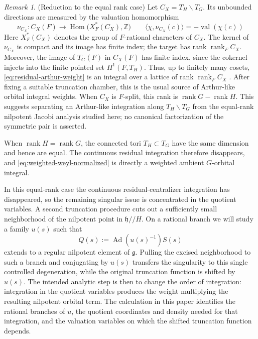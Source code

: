 \documentclass[11pt]{amsart}
\theoremstyle{definition}
\theoremstyle{remark}
\newtheorem{remark}[remark]{Remark}
\newcommand{\Ad}{\operatorname{Ad}}
\newcommand{\rank}{\operatorname{rank}}
\newcommand{\Hom}{\operatorname{Hom}}
\newcommand{\val}{\operatorname{val}}
\newcommand{\g}{\mathfrak g}
\newcommand{\h}{\mathfrak h}
\begin{document}
\begin{remark}\label{rem:equal-rank-reduction} (Reduction to the equal rank case)
Let $C_X=T_H\backslash T_G$.  Its unbounded directions are measured by
the valuation homomorphism
\[
 \nu_{C_X}:C_X(F)\longrightarrow
 \Hom\bigl(X_F^*(C_X),\mathbb Z\bigr)
 \qquad
 \langle\chi,\nu_{C_X}(c)\rangle=-\val(\chi(c))
\]
Here $X_F^*(C_X)$ denotes the group of $F$-rational characters of $C_X$.
The kernel of $\nu_{C_X}$ is compact and its image has finite index; the
target has rank $\rank_F C_X$.  Moreover, the image of $T_G(F)$ in $C_X(F)$ has finite index,
since the cokernel injects into the finite pointed set $H^1(F,T_H)$.  Thus,
up to finitely many cosets, \eqref{eq:residual-arthur-weight} is an integral
over a lattice of rank $\rank_F C_X$ \cite{Serre}.  After fixing a suitable truncation
chamber, this is the usual source of Arthur-like orbital integral weights.  When $C_X$ is $F$-split, this rank is
$\rank G-\rank H$.  This suggests separating an Arthur-like integration along
$T_H\backslash T_G$ from the equal-rank nilpotent Jacobi analysis studied here;
no canonical factorization of the symmetric pair is asserted.
\end{remark}

When $\rank H=\rank G$, the connected tori $T_H\subset T_G$ have the same
dimension and hence are equal.  The continuous residual integration therefore
disappears, and \eqref{eq:weighted-weyl-normalized} is directly a weighted
ambient $G$-orbital integral.

In this equal-rank case the continuous residual-centralizer integration has
disappeared, so the remaining singular issue is concentrated in the quotient
variables.  A second truncation procedure cuts out a sufficiently small neighborhood
of the nilpotent point in $\h/\!/H$.  On a rational branch we will study a family
$u(s)$ such that
\[
 Q(s):=\Ad(u(s)^{-1})S(s)
\]
extends to a regular nilpotent element of $\g$.  Pulling the excised
neighborhood to such a branch and conjugating by $u(s)$ transfers the
singularity to this single controlled degeneration, while the original
truncation function is shifted by $u(s)$.  The intended analytic step is then
to change the order of integration: integration in the quotient variables
produces the weight multiplying the resulting nilpotent orbital term.  The
calculation in this paper identifies the rational branches of $u$, the
quotient coordinates and density needed for that integration, and the
valuation variables on which the shifted truncation function depends.
\end{document}
